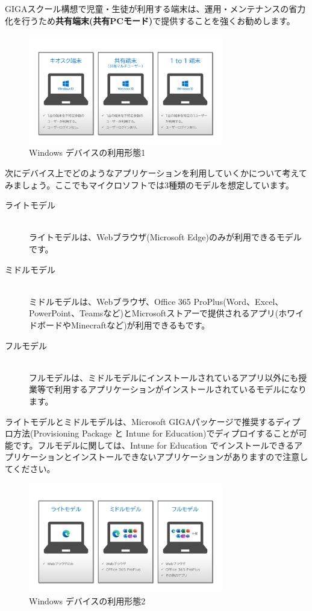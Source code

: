 GIGAスクール構想で児童・生徒が利用する端末は、運用・メンテナンスの省力化を行うため\textbf{共有端末(共有PCモード)}で提供することを強くお勧めします。


\begin{figure}[htbp]
    \centering
    \includegraphics[width=8.5cm]{figures/HowtoUsePC-1.png}
    \caption{Windows デバイスの利用形態1}
    \label{fig:Windowデバイスの利用形態1}
\end{figure}

次にデバイス上でどのようなアプリケーションを利用していくかについて考えてみましょう。ここでもマイクロソフトでは3種類のモデルを想定しています。

\begin{description}
    \item[ライトモデル]\mbox{}\\
    ライトモデルは、Webブラウザ(Microsoft Edge)のみが利用できるモデルです。
    \item[ミドルモデル]\mbox{}\\
    ミドルモデルは、Webブラウザ、Office 365 ProPlus(Word、Excel、PowerPoint、Teamsなど)とMicrosoftストアーで提供されるアプリ(ホワイドボードやMinecraftなど)が利用できるもです。
    \item[フルモデル]\mbox{}\\
    フルモデルは、ミドルモデルにインストールされているアプリ以外にも授業等で利用するアプリケーションがインストールされているモデルになります。
\end{description}

ライトモデルとミドルモデルは、Microsoft GIGAパッケージで推奨するディプロ方法(Provisioning Package と Intune for Education)でディプロイすることが可能です。フルモデルに関しては、Intune for Education でインストールできるアプリケーションとインストールできないアプリケーションがありますので注意してください。

\begin{figure}[htbp]
    \centering
    \includegraphics[width=8.5cm]{figures/HowtoUsePC-2.png}
    \caption{Windows デバイスの利用形態2}
    \label{fig:Windowデバイスの利用形態2}
\end{figure}

